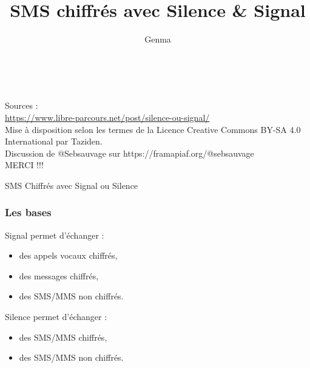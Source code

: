 \documentclass{beamer}
\title[SMS chiffrés avec Silence \& Signal]{SMS chiffrés avec Silence \& Signal}
\author{Genma}
\begin{document}
\begin{frame}
	\titlepage
	\vfill
	\begin{center}
		\\[2.5ex]
		{\tiny\CcNote{\CcLongnameByNcSa}}
		\vspace*{-2.5ex}
	\end{center}
\end{frame}
\begin{frame}
Sources : 
\\ \url{https://www.libre-parcours.net/post/silence-ou-signal/}
\\ Mise à disposition selon les termes de la Licence Creative Commons BY-SA 4.0 International
par Taziden. 
\\ Discussion de @Sebsauvage sur https://framapiaf.org/@sebsauvage
\\ MERCI !!!
\end{frame}

\begin{frame}
\Huge{\centerline{SMS Chiffrés avec Signal ou Silence}}
\end{frame}

\begin{frame}
\frametitle{Les bases}

\begin{block}{Signal permet d’échanger :}
\begin{itemize}
\item des appels vocaux chiffrés,
\item des messages chiffrés,
\item des SMS/MMS non chiffrés.
\end{itemize}
\end{block}

\begin{block}{Silence permet d’échanger :}
\begin{itemize}
\item des SMS/MMS chiffrés,
\item des SMS/MMS non chiffrés.
\end{itemize}
\end{block}
\end{frame}
\end{document}

